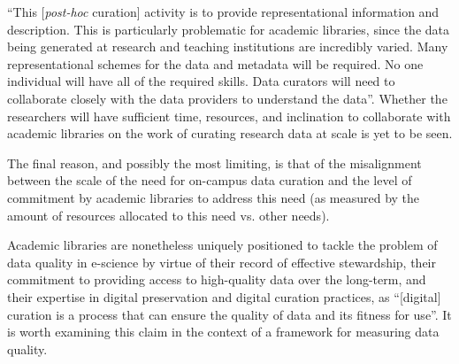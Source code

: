 \documentclass{acm_proc_article-sp}
\begin{document}
``This [\textit{post-hoc} curation] activity is to provide
representational information and description. This is particularly
problematic for academic libraries, since the data being generated at
research and teaching institutions are incredibly varied. Many
representational schemes for the data and metadata will be
required. No one individual will have all of the required skills. Data
curators will need to collaborate closely with the data providers to
understand the data''\cite{heidorn:libraries}. Whether the researchers
will have sufficient time, resources, and inclination to collaborate
with academic libraries on the work of curating research data at scale
is yet to be seen.

The final reason, and possibly the most limiting, is that of the
misalignment between the scale of the need for on-campus data curation
and the level of commitment by academic libraries to address this need
(as measured by the amount of resources allocated to this need
vs. other needs).

Academic libraries are nonetheless uniquely positioned to tackle the
problem of data quality in e-science by virtue of their record of
effective stewardship, their commitment to providing access to
high-quality data over the long-term, and their expertise in digital
preservation and digital curation practices, as ``[digital] curation
is a process that can ensure the quality of data and its fitness for
use''\cite{curry:community}.  It is worth examining this claim in the
context of a framework for measuring data quality.

%
%
\end{document}
